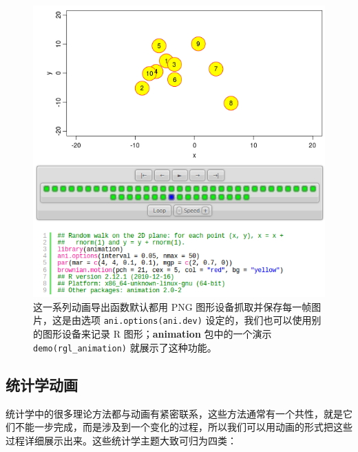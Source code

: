 \documentclass[
  b5paper,
  UTF8,twoside]{book}
\begin{document}
\begin{figure}

{\centering \includegraphics{images/html-interface} 

}

\caption[HTML 页面内的动画界面]{这一系列动画导出函数默认都用 PNG 图形设备抓取并保存每一帧图片，这是由选项 \texttt{ani.options(\textquotesingle{}ani.dev\textquotesingle{})} 设定的，我们也可以使用别的图形设备来记录 R 图形；\textbf{animation} 包中的一个演示 \texttt{demo(\textquotesingle{}rgl\_animation\textquotesingle{})} 就展示了这种功能。}\label{fig:html-interface}
\end{figure}



\subsection{统计学动画}\label{ux7edfux8ba1ux5b66ux52a8ux753b}

统计学中的很多理论方法都与动画有紧密联系，这些方法通常有一个共性，就是它们不能一步完成，而是涉及到一个变化的过程，所以我们可以用动画的形式把这些过程详细展示出来。这些统计学主题大致可归为四类：
\end{document}
